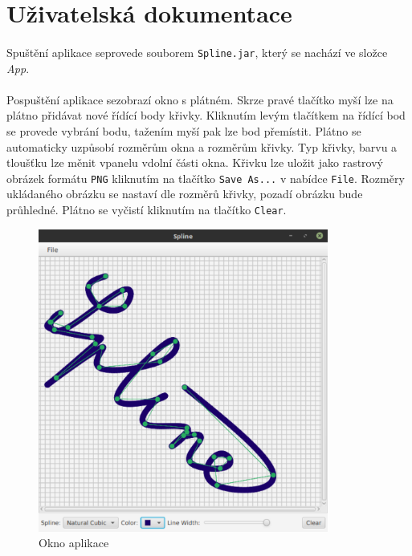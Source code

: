 \documentclass[12pt]{scrartcl}
\begin{document}
\newpage
\section{Uživatelská dokumentace}

\paragraph{}
Spuštění aplikace se\nobreakspace provede souborem \texttt{Spline.jar}, který se nachází ve složce \emph{App}.

\paragraph{}
Po\nobreakspace spuštění aplikace se\nobreakspace zobrazí okno s plátném. Skrze pravé tlačítko myší lze na plátno přidávat nové řídící body křivky. Kliknutím levým tlačítkem na řídící bod se provede vybrání bodu, tažením myší pak lze bod přemístit. Plátno se automaticky uzpůsobí rozměrům okna a rozměrům křivky. Typ křivky, barvu a tloušťku lze měnit v\nobreakspace panelu v\nobreakspace dolní části okna. Křivku lze uložit jako rastrový obrázek formátu \texttt{PNG} kliknutím na tlačítko \texttt{Save As...} v nabídce \texttt{File}. Rozměry ukládaného obrázku se nastaví dle rozměrů křivky, pozadí obrázku bude průhledné. Plátno se vyčistí kliknutím na tlačítko \texttt{Clear}.

\begin{figure}[!ht]
	\centering
	\label{obr:polekolizi}
	\includegraphics[width=0.85\textwidth,natwidth=1,natheight=1]{app_gui.pdf}
	\caption{Okno aplikace}
\end{figure}
\end{document}
